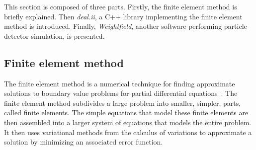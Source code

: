 \documentclass[11pt]{article}
\begin{document}
	This section is composed of three parts. Firstly,
	the finite element method is briefly explained. Then \textit{deal.ii},
	a C++ library implementing the finite element method is introduced. Finally,
	\textit{Weightfield}, another software performing particle detector simulation,
	is presented.

	\subsection{Finite element method}

		The finite element method is a numerical technique for
		finding approximate solutions to boundary value problems for partial
		differential equations~\cite{wiki_fem}. The finite element method subdivides a large
		problem into smaller, simpler, parts, called finite elements. The
		simple equations that model these finite elements are then assembled
		into a larger system of equations that models the entire problem. It
		then uses variational methods from the calculus of variations to
		approximate a solution by minimizing an associated error function.
\end{document}
